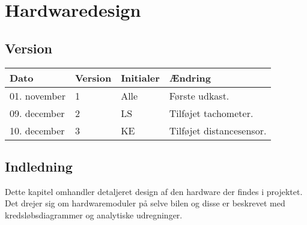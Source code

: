 \chapter{Hardwaredesign}
\section*{Version}
\begin{table}[h]
	\centering
	\begin{tabularx}{\textwidth - 2cm}{|l|l|l|X|}
	\hline
	Dato			& Version			& Initialer 		& Ændring										\\ \hline
	01. november 			& 1 				& Alle				& Første udkast. 						\\ \hline
	09. december 			& 2 				& LS				& Tilføjet tachometer.					\\ \hline
	10. december 			& 3 				& KE				& Tilføjet distancesensor.				\\ \hline

	\end{tabularx}
\end{table}

\section*{Indledning}
Dette kapitel omhandler detaljeret design af den hardware der findes i projektet.
Det drejer sig om hardwaremoduler på selve bilen og disse er beskrevet med kredsløbsdiagrammer og analytiske udregninger.

\clearpage


\clearpage

\clearpage

\clearpage

\clearpage